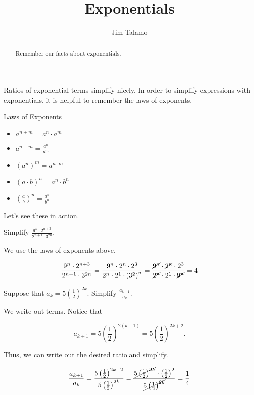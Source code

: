 \documentclass{ximera}
\title[Refresh:]{Exponentials}
\author{Jim Talamo}
\begin{document}
\begin{abstract}
  Remember our facts about exponentials.
\end{abstract}
\maketitle


\begin{exercise}
Ratios of exponential terms simplify nicely. In order to simplify expressions with exponentials, it is helpful to remember the laws of exponents.

\underline{Laws of Exponents}
\begin{itemize}
\item $a^{n+m} = a^n \cdot a^m$
\item $a^{n-m} = \frac{a^n}{a^m}$
\item $\left(a^n\right)^m = a^{n \cdot m}$
\item $(a \cdot b)^n = a^n \cdot b^n$
\item $\left(\frac{a}{b}\right)^n = \frac{a^n}{b^n}$
\end{itemize}

Let's see these in action.

\begin{example}
Simplify $\frac{9^n\cdot 2^{n+3}}{2^{n+1} \cdot 3^{2n}}$.

\begin{explanation}
We use the laws of exponents above.

\[
\frac{9^n\cdot 2^{n+3}}{2^{n+1} \cdot 3^{2n}} = \frac{9^n \cdot 2^n \cdot 2^3}{2^n \cdot 2^1 \cdot \left(3^2\right)^n}= \frac{\cancel{9^n} \cdot \cancel{2^n} \cdot 2^3}{\cancel{2^n} \cdot 2^1 \cdot \cancel{9^n} } =4
\]
\end{explanation}
\end{example}

\begin{example}
Suppose that $a_k = 5\left(\frac{1}{2}\right)^{2k}$.  Simplify $\frac{a_{k+1}}{a_k}$.

\begin{explanation}
We write out terms.  Notice that 

\[
a_{k+1} = 5\left(\frac{1}{2}\right)^{2(k+1)} = 5\left(\frac{1}{2}\right)^{2k+2}.
\]

Thus, we can write out the desired ratio and simplify.

\[
\frac{a_{k+1}}{a_k} = \frac{5\left(\frac{1}{2}\right)^{2k+2}}{5\left(\frac{1}{2}\right)^{2k}}= \frac{\cancel{5\left(\frac{1}{2}\right)^{2k}}\cdot \left(\frac{1}{2}\right)^2}{\cancel{5\left(\frac{1}{2}\right)^{2k}}} = \frac{1}{4}
\]
\end{explanation}
\end{example}


\end{exercise}
\end{document}
